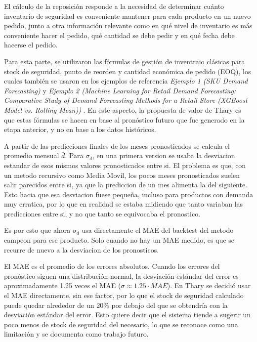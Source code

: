 El cálculo de la reposición responde a la necesidad de determinar cuánto inventario de seguridad es conveniente mantener para cada producto en un nuevo pedido, junto a otra información relevante como en qué nivel de inventario es más conveniente hacer el pedido, qué cantidad se debe pedir y en qué fecha debe hacerse el pedido.

Para esta parte, se utilizaron las fórmulas de gestión de inventraio clásicas para stock de seguridad, punto de reorden y cantidad económica de pedido (EOQ), los cuales también se usaron en los ejemplos de referencia \textit{Ejemplo 1 (SKU Demand Forecasting)} \cite{ejemplo1_demandforecast} y \textit{Ejemplo 2 (Machine Learning for Retail Demand Forecasting: Comparative Study of Demand Forecasting Methods for a Retail Store (XGBoost Model vs. Rolling Mean))} \cite{ejemplo2_saci2020mlretail}. En este aspecto, la propuesta de valor de Thary es que estas fórmulas se hacen en base al pronóstico futuro que fue generado en la etapa anterior, y no en base a los datos históricos. 

A partir de las predicciones finales de los meses pronosticados se calcula el promedio mensual $\bar{d}$. Para $\sigma_d$, en una primera version se usaba la desviacion estandar de esos mismos valores pronosticados entre si. El problema es que, con un metodo recursivo como Media Movil, los pocos meses pronosticados suelen salir parecidos entre si, ya que la prediccion de un mes alimenta la del siguiente. Esto hacia que esa desviacion fuese pequeña, incluso para productos con demanda muy erratica, por lo que en realidad se estaba midiendo que tanto variaban las predicciones entre si, y no que tanto se equivocaba el pronostico.

Es por esto que ahora $\sigma_d$ usa directamente el MAE del backtest del metodo campeon para ese producto. Solo cuando no hay un MAE medido, es que se recurre de nuevo a la desviacion de los pronosticos.

El MAE es el promedio de los errores absolutos. Cuando los errores del pronóstico siguen una distribución normal, la desviación estándar del error es aproximadamente 1.25 veces el MAE ($\sigma \approx 1.25 \cdot MAE$). En Thary se decidió usar el MAE directamente, sin ese factor, por lo que el stock de seguridad calculado puede quedar alrededor de un 20\% por debajo del que se obtendría con la desviación estándar del error. Esto quiere decir que el sistema tiende a sugerir un poco menos de stock de seguridad del necesario, lo que se reconoce como una limitación y se documenta como trabajo futuro.

